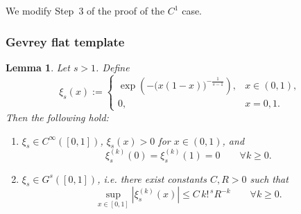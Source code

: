\documentclass{amsart}
\newtheorem{Lemma}[Definition]{Lemma}
\begin{document}
	\vspace{1ex}
	
	
	We modify Step~3 of the proof of the \(C^1\) case.
	
	\vspace{1ex}
	
	\subsubsection{Gevrey flat template}
	\begin{Lemma}
		Let \(s>1\). Define
		\[
		\xi_s(x):=
		\begin{cases}
			\exp\!\left(-\bigl(x(1-x)\bigr)^{-\frac{1}{s-1}}\right), & x\in(0,1),\\
			0, & x=0,1.
		\end{cases}
		\]
		Then the following hold:
		\begin{enumerate}
			\item[(i)] \(\xi_s\in C^\infty([0,1])\), \(\xi_s(x)>0\) for \(x\in(0,1)\), and
			\[
			\xi_s^{(k)}(0)=\xi_s^{(k)}(1)=0\qquad\forall k\ge0.
			\]
			\item[(ii)] \(\xi_s\in G^s([0,1])\), i.e. there exist constants \(C,R>0\) such that
			\[
			\sup_{x\in[0,1]}|\xi_s^{(k)}(x)|\le C\, k!^{\,s}R^{-k}\qquad\forall k\ge0.
			\]
			
		\end{enumerate}
	\end{Lemma}
	
\end{document}

